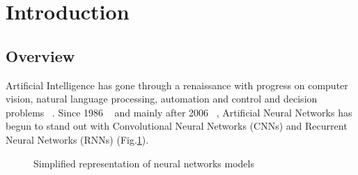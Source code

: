 \section{Introduction}

\subsection{Overview}
Artificial Intelligence has gone through a renaissance with progress on computer vision, natural language processing, automation and control and decision problems ~\cite{Battaglia_2018}. Since 1986 ~\cite{Rumelhart_1986} and mainly after 2006 ~\cite{Hinton_2006}, Artificial Neural Networks has begun to stand out with Convolutional Neural Networks (CNNs) and Recurrent Neural Networks (RNNs) (Fig.\ref{fig:simple_neural_network}).


\begin{figure}[H]
\centering
{}
\caption{Simplified representation of neural networks models ~\cite{Battaglia_2018}}

\label{fig:simple_neural_network}
\end{figure}

